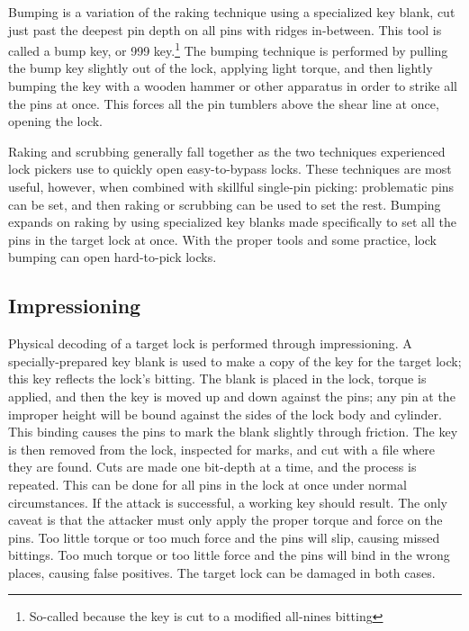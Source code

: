 \documentclass{acm_proc_article-sp}
\begin{document}
Bumping is a variation of the raking technique using a specialized key blank, cut just past the deepest pin depth on all pins with ridges in-between. This tool is called a bump key, or 999 key.\footnote{So-called because the key is cut to a modified all-nines bitting} The bumping technique is performed by pulling the bump key slightly out of the lock, applying light torque, and then lightly bumping the key with a wooden hammer or other apparatus in order to strike all the pins at once. This forces all the pin tumblers above the shear line at once, opening the lock.

Raking and scrubbing generally fall together as the two techniques experienced lock pickers use to quickly open easy-to-bypass locks. These techniques are most useful, however, when combined with skillful single-pin picking: problematic pins can be set, and then raking or scrubbing can be used to set the rest. Bumping expands on raking by using specialized key blanks made specifically to set all the pins in the target lock at once. With the proper tools and some practice, lock bumping can open hard-to-pick locks.

\subsection{Impressioning}
Physical decoding of a target lock is performed through impressioning. A specially-prepared key blank is used to make a copy of the key for the target lock; this key reflects the lock's bitting. The blank is placed in the lock, torque is applied, and then the key is moved up and down against the pins; any pin at the improper height will be bound against the sides of the lock body and cylinder. This binding causes the pins to mark the blank slightly through friction. The key is then removed from the lock, inspected for marks, and cut with a file where they are found. Cuts are made one bit-depth at a time, and the process is repeated. This can be done for all pins in the lock at once under normal circumstances. If the attack is successful, a working key should result. The only caveat is that the attacker must only apply the proper torque and force on the pins. Too little torque or too much force and the pins will slip, causing missed bittings. Too much torque or too little force and the pins will bind in the wrong places, causing false positives. The target lock can be damaged in both cases.
\end{document}
